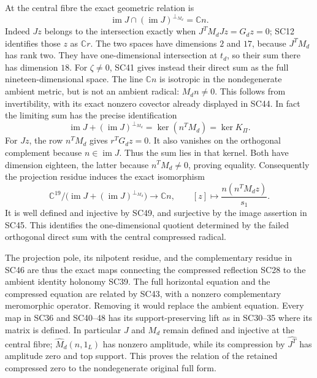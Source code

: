 \documentclass[11pt,a4paper]{article}
\theoremstyle{definition}\newtheorem{definition}[theorem]{Definition}
\begin{document}
At the central fibre the exact geometric relation is
\[
 \operatorname{im}J\cap(\operatorname{im}J)^{\perp_{M_d}}
     =\mathbb Cn .
 \tag{SC48}
\]
Indeed \(Jz\) belongs to the intersection exactly when
\(J^TM_dJz=G_dz=0\); SC12 identifies those \(z\) as
\(\mathbb Cr\). The two spaces have dimensions \(2\) and
\(17\), because \(J^TM_d\) has rank two. They have
one-dimensional intersection at \(t_d\), so their sum there
has dimension \(18\). For \(\zeta\ne0\), SC41 gives instead
their direct sum as the full nineteen-dimensional space.
The line \(\mathbb Cn\) is isotropic in the nondegenerate
ambient metric, but is not an ambient radical: \(M_dn\ne0\).
This follows from invertibility, with its exact nonzero
covector already displayed in SC44.
In fact the limiting sum has the precise identification
\[
 \operatorname{im}J+(\operatorname{im}J)^{\perp_{M_d}}
   =\ker(n^TM_d)=\ker K_\Pi .
 \tag{SC49}
\]
For \(Jz\), the row \(n^TM_d\) gives
\(r^TG_dz=0\). It also vanishes on the orthogonal complement
because \(n\in\operatorname{im}J\). Thus the sum lies in that
kernel. Both have dimension eighteen, the latter because
\(n^TM_d\ne0\), proving equality.
Consequently the projection residue induces the exact
isomorphism
\[
 \mathbb C^{19}/\bigl(\operatorname{im}J+
            (\operatorname{im}J)^{\perp_{M_d}}\bigr)
 \longrightarrow\mathbb Cn,\qquad
 [z]\longmapsto \frac{n(n^TM_dz)}{s_1}.
\]
It is well defined and injective by SC49, and surjective
by the image assertion in SC45. This identifies the
one-dimensional quotient determined by the failed
orthogonal direct sum with the central compressed radical.

The projection pole, its nilpotent residue, and the
complementary residue in SC46 are thus the exact maps
connecting the compressed reflection SC28 to the ambient
identity holonomy SC39. The full horizontal equation and
the compressed equation are related by SC43, with a
nonzero complementary meromorphic operator. Removing it
would replace the ambient equation. Every map in SC36 and
SC40--48 has its support-preserving lift as in SC30--35
where its matrix is defined. In particular \(J\) and \(M_d\)
remain defined and injective at the central fibre;
\(\widehat M_d(n,1_L)\) has nonzero amplitude, while its
compression by \(\widehat{J^T}\) has amplitude zero and
top support. This proves the relation of the retained
compressed zero to the nondegenerate original full form.
\end{document}
